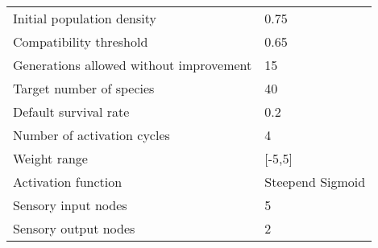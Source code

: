 \begin{table}[h!]
\begin{tabular}{@{}ll@{}}
Initial population density                     & 0.75             \\
Compatibility threshold                        & 0.65             \\
Generations allowed without improvement        & 15               \\
Target number of species                       & 40               \\
Default survival rate                          & 0.2              \\
Number of activation cycles                    & 4                \\
Weight range                                   & {[}-5,5{]}       \\
Activation function                            & Steepend Sigmoid \\
Sensory input nodes                            & 5                \\
Sensory output nodes                           & 2                \\ \bottomrule
\end{tabular}
\end{table}    
